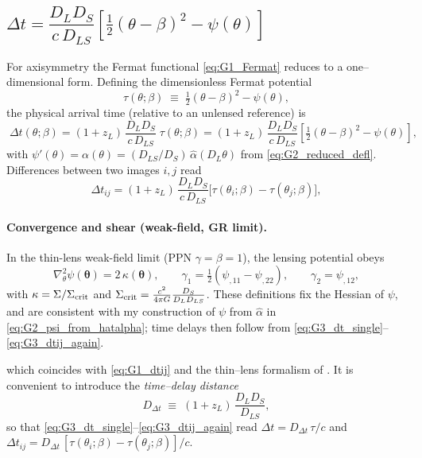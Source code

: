\documentclass{iopjournal}
\begin{document}
\subsection{\texorpdfstring
  {$\Delta t=\dfrac{D_LD_S}{c\,D_{LS}}\!\left[\tfrac12(\theta-\beta)^2-\psi(\theta)\right]$}
  {Delta t = (DL DS)/(c DLS) [ 1/2 (theta - beta) squared - psi(theta) ]}}\label{app:G3}

  For axisymmetry the Fermat functional \eqref{eq:G1_Fermat} reduces to a one–dimensional form. Defining the dimensionless Fermat potential
\begin{equation}
\tau(\theta;\beta)\;\equiv\;\tfrac12(\theta-\beta)^2-\psi(\theta),
\label{eq:G3_tau_def}
\end{equation}
the physical arrival time (relative to an unlensed reference) is
\begin{equation}
\boxed{\;
\Delta t(\theta;\beta)
=(1+z_L)\,\frac{D_LD_S}{c\,D_{LS}}\;\tau(\theta;\beta)
=(1+z_L)\,\frac{D_LD_S}{c\,D_{LS}}\!\left[\tfrac12(\theta-\beta)^2-\psi(\theta)\right],
\;}
\label{eq:G3_dt_single}
\end{equation}
with $\psi'(\theta)=\alpha(\theta)=(D_{LS}/D_S)\,\hat\alpha(D_L\theta)$ from \eqref{eq:G2_reduced_defl}. Differences between two images $i,j$ read
\begin{equation}
\Delta t_{ij}=(1+z_L)\,\frac{D_L D_S}{c\,D_{LS}}\Big[\tau(\theta_i;\beta)-\tau(\theta_j;\beta)\Big],
\label{eq:G3_dtij_again}
\end{equation}
\paragraph{Convergence and shear (weak-field, GR limit).}
In the thin-lens weak-field limit (PPN $\gamma=\beta=1$), the lensing potential obeys
\begin{equation}
\nabla_{\!\theta}^{2}\psi(\boldsymbol\theta)=2\,\kappa(\boldsymbol\theta),\qquad
\gamma_1=\tfrac12(\psi_{,11}-\psi_{,22}),\qquad
\gamma_2=\psi_{,12},
\label{eq:G_extra_kappa_shear}
\end{equation}
with $\kappa=\Sigma/\Sigma_{\rm crit}$ and $\Sigma_{\rm crit}=\tfrac{c^2}{4\pi G}\tfrac{D_S}{D_L D_{LS}}$. These definitions fix the Hessian of $\psi$, and are consistent with my construction of $\psi$ from $\hat\alpha$ in \eqref{eq:G2_psi_from_hatalpha}; time delays then follow from \eqref{eq:G3_dt_single}–\eqref{eq:G3_dtij_again}.

which coincides with \eqref{eq:G1_dtij} and the thin–lens formalism of \cite{SchneiderEhlersFalco1992,BlandfordNarayan1986,Perlick2004LRR}. It is convenient to introduce the \emph{time–delay distance}
\begin{equation}
D_{\Delta t}\;\equiv\;(1+z_L)\,\frac{D_L D_S}{D_{LS}},
\label{eq:G3_DDelta}
\end{equation}
so that \eqref{eq:G3_dt_single}–\eqref{eq:G3_dtij_again} read $\Delta t=D_{\Delta t}\,\tau/c$ and $\Delta t_{ij}=D_{\Delta t}\,[\tau(\theta_i;\beta)-\tau(\theta_j;\beta)]/c$.
\end{document}
